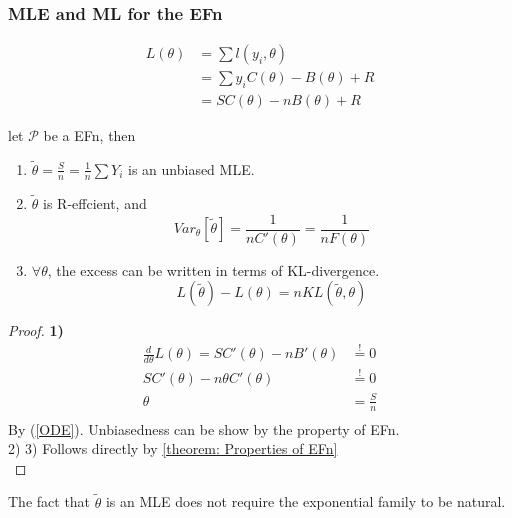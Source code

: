 \subsubsection*{MLE and ML for the EFn}

\begin{align*}
	L(\theta) &= \sum l(y_i, \theta)\\
	&= \sum y_iC(\theta) - B(\theta) + R\\
	&= S C(\theta) - n B(\theta) + R
\end{align*}

\begin{theorem}
	let $\mathcal{P}$ be a EFn, then
	\begin{enumerate}
		\item $\tilde{\theta} = \frac{S}{n} = \frac{1}{n} \sum Y_i$ is an unbiased MLE.
		\item $\tilde{\theta}$ is R-effcient, and 
			\begin{equation*}
				Var_\theta[\tilde{\theta}] = \frac{1}{nC'(\theta)} = \frac{1}{n F(\theta)}
			\end{equation*}
		\item $\forall \theta$, the excess can be written in terms of KL-divergence.
			\begin{equation*}
				L(\tilde{\theta}) - L(\theta) = n KL(\tilde{\theta}, \theta)
			\end{equation*}
	\end{enumerate}
\end{theorem}
	
\begin{proof}
\textbf{1)}
\begin{equation*}
	\begin{aligned}
		\frac{d}{d\theta}L(\theta) = S C'(\theta) - n B'(\theta) &\overset{!}{=} 0\\
		SC'(\theta) - n \theta C'(\theta) &\overset{!}{=} 0\\
		\theta &= \frac{S}{n}\\
	\end{aligned}
\end{equation*}
By (\ref{ODE}).  Unbiasedness can be show by the property of EFn.\\
2) 3) Follows directly by \ref{theorem: Properties of EFn} \\
\end{proof}

\begin{remark} The fact that $\tilde{\theta}$ is an MLE does not require the exponential family to be natural. 
\end{remark}



